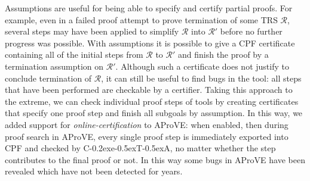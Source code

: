 \documentclass[USenglish]{eptcs}
\newcommand\aprove{\textsf{AProVE}\xspace}
\newcommand\RR{\ensuremath{\mathcal{R}}\xspace}
\newcommand\ceta{\textsf{C\kern-0.2exe\kern-0.5exT\kern-0.5exA}\xspace}
\begin{document}
Assumptions are useful for being able to specify and certify partial proofs.
For example, even in a failed proof attempt to prove termination of some TRS
$\RR$, several steps may have been applied to simplify $\RR$ into $\RR'$ before
no further progress was possible.  With assumptions it is possible to give a
CPF certificate containing all of the initial steps from $\RR$ to $\RR'$ and
finish the proof by a termination assumption on $\RR'$.  Although such a
certificate does not justify to conclude termination of $\RR$, it can still be
useful to find bugs in the tool: all steps that have been performed are
checkable by a certifier.
Taking this approach to the extreme, we can check individual proof steps of tools by
creating certificates that specify one proof step and finish all subgoals by assumption.
In this way, we added support for \emph{online-certification} to \aprove: when
enabled, then during proof search in \aprove, every single proof step is immediately exported 
into CPF and checked by \ceta, no matter whether the step contributes to the final proof or not.
In this way some bugs in \aprove have been revealed which have not been detected for years.
\end{document}
